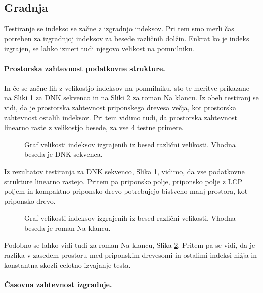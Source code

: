 \subsection{Gradnja}
Testiranje se indekso se začne z izgradnjo indeksov. Pri tem smo merli čas potreben za izgradnjoj indeksov za besede različnih dolžin. Enkrat ko je indeks izgrajen, se lahko izmeri tudi njegovo velikost na pomnilniku.

\paragraph{Prostorska zahtevnost podatkovne strukture.}
In če se začne lih z velikostjo indeksov na pomnilniku, sto te meritve prikazane na Sliki \ref{fig:VelikostGraf} za DNK sekvenco in na Sliki \ref{fig:VelikostGrafSLO} za roman Na klancu. Iz obeh testiranj se vidi, da je prostorska zahtevnost priponskega drevesa večja, kot prostorska zahtevnost ostalih indeksov. Pri tem vidimo tudi, da prostorska zahtevnost linearno raste z velikostjo besede, za vse 4 testne primere.

\begin{figure}[htb]
    \centering
    
    \caption{Graf velikosti indeksov izgrajenih iz besed različni velikosti. Vhodna beseda je DNK sekvenca.} 
    \label{fig:VelikostGraf}
\end{figure}

Iz rezultatov testiranja za DNK sekvenco, Slika \ref{fig:VelikostGraf}, vidimo, da vse podatkovne strukture linearno rastejo. Pritem pa priponsko polje, priponsko polje z LCP poljem in kompaktno priponsko drevo potrebujejo bistveno manj prostora, kot priponsko drevo.

\begin{figure}[tb]
    
    \caption{Graf velikosti indeksov izgrajenih iz besed različni velikosti. Vhodna beseda je roman Na klancu.} 
    \label{fig:VelikostGrafSLO}
\end{figure}

Podobno se lahko vidi tudi za roman Na klancu, Slika \ref{fig:VelikostGrafSLO}. Pritem pa se vidi, da je razlika v zasedem prostoru med priponskim drevesomi in ostalimi indeksi nižja in konstantna skozli celotno izvajanje testa.

\paragraph{Časovna zahtevnost izgradnje.}

